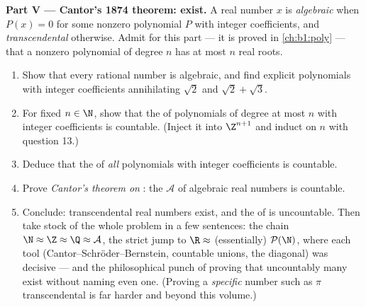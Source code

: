 \begin{problem}
\medskip
\noindent\textbf{Part V --- Cantor's 1874 theorem:  exist.} A real number $x$ is \emph{algebraic}
 when $P(x) = 0$ for some nonzero polynomial
$P$ with integer coefficients, and \emph{transcendental}
 otherwise. Admit for this part --- it
is proved in \cref{ch:b1:poly} --- that a nonzero polynomial of
degree $n$ has at most $n$ real roots.
\begin{enumerate}[resume]
  \item Show that every rational number is algebraic, and find
        explicit polynomials with integer coefficients annihilating
        $\sqrt 2$ and $\sqrt 2 + \sqrt 3$.
  \item For fixed $n \in \N$, show that the  of polynomials of
        degree at most $n$ with integer coefficients is countable.
        (Inject it into $\Z^{n+1}$ and induct on $n$ with
        question 13.)
  \item Deduce that the  of \emph{all} polynomials with integer
        coefficients is countable.
  \item Prove \emph{Cantor's theorem on }: the 
        $\mathcal{A}$ of algebraic real numbers is countable.
  \item Conclude: transcendental real numbers exist, and the  of
         is uncountable. Then take stock of
        the whole problem in a few sentences: the chain $\N \approx
        \Z \approx \Q \approx \mathcal{A}$, the strict jump to $\R
        \approx$ (essentially) $\mathcal{P}(\N)$, where each tool
        (Cantor--Schr\"oder--Bernstein, countable unions, the
        diagonal) was decisive --- and the philosophical punch of
        proving that uncountably many  exist
        without naming even one. (Proving a \emph{specific} number
        such as $\pi$ transcendental is far harder and beyond this
        volume.)
\end{enumerate}
\end{problem}

